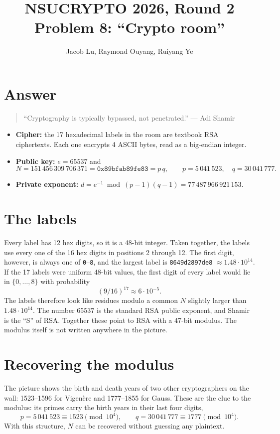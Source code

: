 \documentclass[11pt,a4paper]{article}
\title{NSUCRYPTO 2026, Round 2\\Problem 8: ``Crypto room''}
\date{}
\author{Jacob Lu, Raymond Ouyang, Ruiyang Ye}
\newcommand{\tx}[1]{\texttt{#1}}
\begin{document}
\maketitle

\section*{Answer}

\begin{quote}
``Cryptography is typically bypassed, not penetrated.'' --- Adi Shamir
\end{quote}

\begin{itemize}
  \item \textbf{Cipher:} the 17 hexadecimal labels in the room are textbook
  RSA ciphertexts. Each one encrypts 4 ASCII bytes, read as a big-endian
  integer.
  \item \textbf{Public key:} $e=65537$ and
  \[
  N = 151\,456\,309\,706\,371 = \tx{0x89bfab89fe83} = p\,q,
  \qquad p = 5\,041\,523,\quad q = 30\,041\,777 .
  \]
  \item \textbf{Private exponent:}
  $d = e^{-1} \bmod (p-1)(q-1) = 77\,487\,966\,921\,153$.
\end{itemize}

\section{The labels}

Every label has 12 hex digits, so it is a 48-bit integer. Taken together,
the labels use every one of the 16 hex digits in positions 2 through 12. The
first digit,
however, is always one of \tx{0}--\tx{8}, and the largest label is
\tx{8649d2897de8} $\approx 1.48\cdot 10^{14}$. If the 17 labels were uniform
48-bit values, the first digit of every label would lie in $\{0,\dots,8\}$
with probability
\[
(9/16)^{17} \approx 6\cdot 10^{-5}.
\]
The labels therefore look like residues modulo a common $N$ slightly larger
than $1.48\cdot 10^{14}$. The number $65537$ is the standard RSA public
exponent, and Shamir is the ``S'' of RSA. Together these point to RSA with a
47-bit modulus. The modulus itself is not written anywhere in the picture.

\section{Recovering the modulus}

The picture shows the birth and death years of two other cryptographers on the
wall: 1523--1596 for Vigen\`ere and 1777--1855 for Gauss. These are the clue to
the modulus: its primes carry the birth years in their last four digits,
\[
p = 5\,041\,523 \equiv 1523 \pmod{10^4}, \qquad
q = 30\,041\,777 \equiv 1777 \pmod{10^4}.
\]
 With this structure, $N$ can be recovered
without guessing any plaintext.
\end{document}
